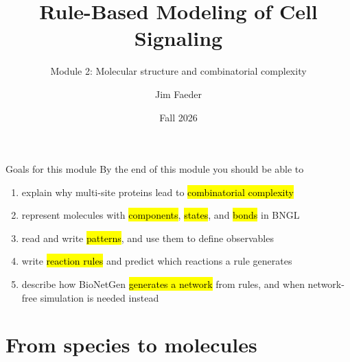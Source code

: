 \documentclass[aspectratio=169,10pt,t]{beamer}
\title{Rule-Based Modeling of Cell Signaling}
\subtitle{Module 2: Molecular structure and combinatorial complexity}
\author{Jim Faeder}
\institute{MSCBIO 2025 \textperiodcentered{} Introduction to Bioinformatics Programming in Python}
\date{Fall 2026}
\begin{document}
\begin{frame}[plain]
  \titlepage
\end{frame}



\begin{frame}{Goals for this module}
  By the end of this module you should be able to
  \begin{enumerate}[<+->]
    \setlength\itemsep{1.5mm}
    \item explain why multi-site proteins lead to \hl{combinatorial complexity}
    \item represent molecules with \hl{components}, \hl{states}, and \hl{bonds} in BNGL
    \item read and write \hl{patterns}, and use them to define observables
    \item write \hl{reaction rules} and predict which reactions a rule generates
    \item describe how BioNetGen \hl{generates a network} from rules, and when
          network-free simulation is needed instead
  \end{enumerate}
\end{frame}

\section{From species to molecules}
\end{document}
